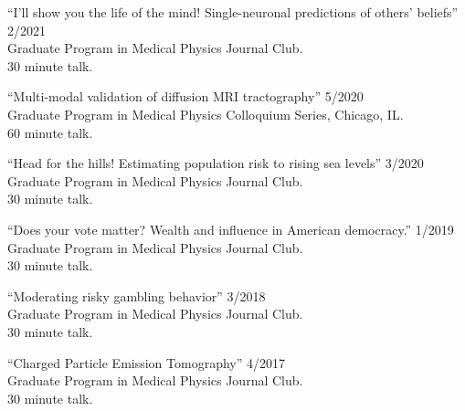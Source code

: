 \documentclass[10pt,letterpaper]{article}
\begin{document}
\begin{etaremune}[labelsep=0.035\textwidth]

\item {``I'll show you the life of the mind! Single-neuronal predictions of
    others' beliefs'' \hfill 2/2021\\
    Graduate Program in Medical Physics Journal Club. \\
    30 minute talk.
  }
\item{``Multi-modal validation of diffusion MRI tractography'' \hfill 5/2020\\
    Graduate Program in Medical Physics Colloquium Series, Chicago, IL.\\
    60 minute talk.}

\item{``Head for the hills! Estimating population risk to rising sea levels'' \hfill 3/2020\\
    Graduate Program in Medical Physics Journal Club. \\
    30 minute talk.}

\item{``Does your vote matter? Wealth and influence in American democracy.'' \hfill 1/2019\\
    Graduate Program in Medical Physics Journal Club. \\
    30 minute talk.}

\item{``Moderating risky gambling behavior'' \hfill 3/2018\\
    Graduate Program in Medical Physics Journal Club. \\
    30 minute talk.}
  
\item{``Charged Particle Emission Tomography'' \hfill 4/2017\\
    Graduate Program in Medical Physics Journal Club. \\
    30 minute talk.}

\end{etaremune}
\end{document}
